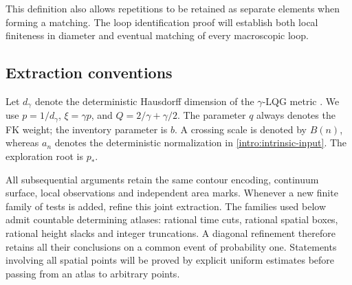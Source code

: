 This definition also allows repetitions to be retained as separate
elements when forming a matching. The loop identification proof will
establish both local finiteness in diameter and eventual matching of
every macroscopic loop.

\subsection{Extraction conventions}

Let $d_\gamma$ denote the deterministic Hausdorff dimension of the
$\gamma$-LQG metric \citep{GwynneMillerMetric}. We use
$p=1/d_\gamma$, $\xi=\gamma p$, and
$Q=2/\gamma+\gamma/2$. The parameter $q$ always denotes the FK
weight; the inventory parameter is $b$. A crossing scale is denoted
by $B(n)$, whereas $a_n$ denotes the deterministic normalization in
\cref{intro:intrinsic-input}. The exploration root is $p_*$.

All subsequential arguments retain the same contour encoding,
continuum surface, local observations and independent area marks.
Whenever a new finite family of tests is added, refine this joint
extraction. The families used below admit countable determining
atlases: rational time cuts, rational spatial boxes, rational height
slacks and integer truncations. A diagonal refinement therefore
retains all their conclusions on a common event of probability one.
Statements involving all spatial points will be proved by explicit
uniform estimates before passing from an atlas to arbitrary points.
